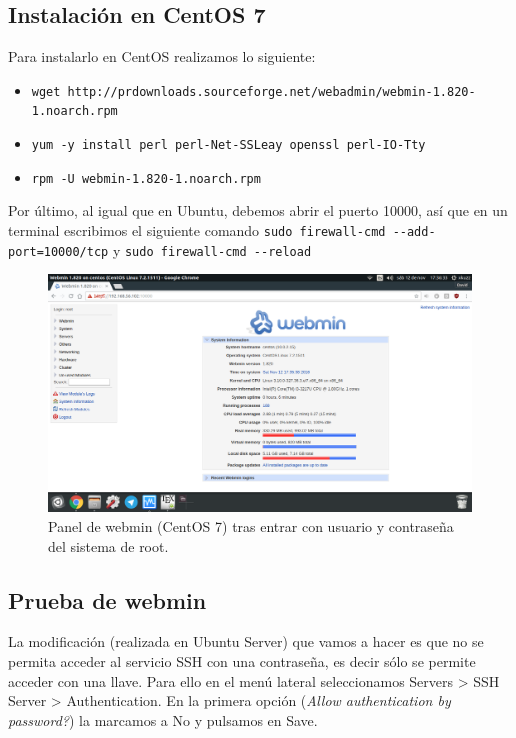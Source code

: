 \begin{flushleft}
\subsection{Instalación en CentOS 7}
Para instalarlo en CentOS realizamos lo siguiente: \cite{c12a1}
\begin{itemize}
	\item \verb|wget http://prdownloads.sourceforge.net/webadmin/webmin-1.820-1.noarch.rpm|
	\item \verb|yum -y install perl perl-Net-SSLeay openssl perl-IO-Tty|
	\item \verb|rpm -U webmin-1.820-1.noarch.rpm|
\end{itemize}

Por último, al igual que en Ubuntu, debemos abrir el puerto 10000, así que en un terminal escribimos el siguiente comando \verb|sudo firewall-cmd --add-port=10000/tcp| y \verb|sudo firewall-cmd --reload|

\begin{figure}[H]
	\centering
	\includegraphics[scale=0.3]{webmin1-c.png}
	\caption{Panel de webmin (CentOS 7) tras entrar con usuario y contraseña del sistema de root.}
\end{figure}

\subsection{Prueba de webmin}
La modificación (realizada en Ubuntu Server) que vamos a hacer es que no se permita acceder al servicio SSH con una contraseña, es decir sólo se permite acceder con una llave. Para ello en el menú lateral seleccionamos Servers > SSH Server > Authentication. En la primera opción (\textit{Allow authentication by password?}) la marcamos a No y pulsamos en Save.


\end{flushleft}
